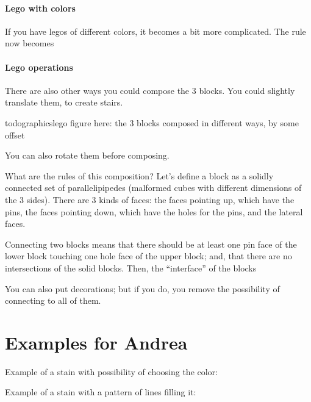 \paragraph{Lego with colors}

If you have legos of different colors, it becomes a bit more complicated. The rule now becomes


\paragraph{Lego operations}

There are also other ways you could compose the 3 blocks. You could slightly translate them, to create stairs.

todographics{lego figure here: the 3 blocks composed in different ways, by some offset}

You can also rotate them before composing.


What are the rules of this composition? Let's define a block as a solidly connected set of parallelipipedes (malformed cubes with different dimensions of the 3 sides). There are 3 kinds of faces: the faces pointing up, which have the pins, the faces pointing down, which have the holes for the pins, and the lateral faces.

Connecting two blocks means that there should be at least one pin face of the lower block touching one hole face of the upper block; and, that there are no intersections of the solid blocks. Then, the ``interface'' of the blocks


You can also put decorations; but if you do, you remove the possibility of connecting to all of them.



\section{Examples for Andrea}


Example of a stain with possibility of choosing the color:
\begin{center}
\end{center}

Example of a stain with a pattern of lines filling it:

\stainfilled


